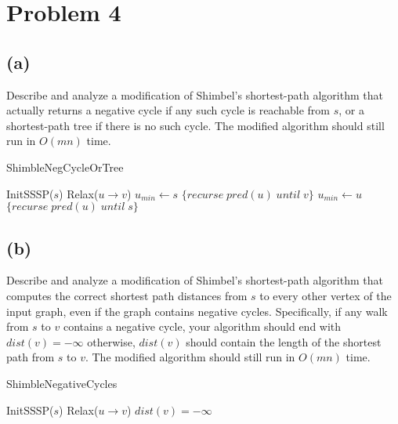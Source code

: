 \documentclass[12pt]{article}
\begin{document}
\pagebreak

\section*{Problem 4}

\subsection*{(a)}
Describe and analyze a modification of Shimbel's shortest-path algorithm
that actually returns a negative cycle if any such cycle is reachable
from $s$, or a shortest-path tree if there is no such cycle. The modified
algorithm should still run in $O(mn)$ time.

\begin{algorithm}
\caption{ShimbleNegCycleOrTree}
\begin{algorithmic}
    \STATE InitSSSP($s$)
                \STATE Relax($u \rightarrow v$)
            \ENDIF
        \ENDFOR
    \ENDFOR
    \STATE $u_{min} \leftarrow s$
            \RETURN $\{ recurse\; pred(u)\; until\; v \}$
        \ENDIF
            \STATE $u_{min} \leftarrow u$
        \ENDIF
        \RETURN $\{ recurse\; pred(u)\; until\; s \}$
    \ENDFOR
\end{algorithmic}
\end{algorithm}

\pagebreak

\subsection*{(b)}
Describe and analyze a modification of Shimbel's shortest-path
algorithm that computes the correct shortest path distances from $s$ to
every other vertex of the input graph, even if the graph contains
negative cycles. Specifically, if any walk from $s$ to $v$ contains a
negative cycle, your algorithm should end with $dist(v) = -\infty$
otherwise, $dist(v)$ should contain the length of the shortest path
from $s$ to $v$. The modified algorithm should still run in $O(mn)$
time.

\begin{algorithm}
\caption{ShimbleNegativeCycles}
\begin{algorithmic}
    \STATE InitSSSP($s$)
                \STATE Relax($u \rightarrow v$)
            \ENDIF
        \ENDFOR
    \ENDFOR
            \STATE $dist(v) = -\infty$
        \ENDIF
    \ENDFOR
\end{algorithmic}
\end{algorithm}
\end{document}
